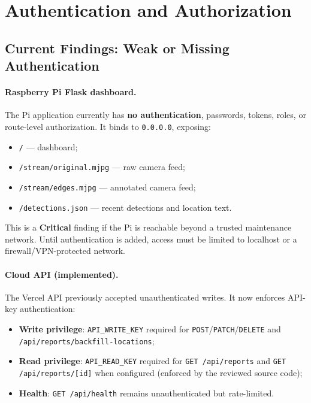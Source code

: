 \documentclass[12pt]{article}
\begin{document}
\section{Authentication and Authorization}
\label{sec:auth}

\subsection{Current Findings: Weak or Missing Authentication}

\paragraph{Raspberry Pi Flask dashboard.}
The Pi application currently has \textbf{no authentication}, passwords, tokens,
roles, or route-level authorization. It binds to \texttt{0.0.0.0}, exposing:

\begin{itemize}
    \item \texttt{/} --- dashboard;
    \item \texttt{/stream/original.mjpg} --- raw camera feed;
    \item \texttt{/stream/edges.mjpg} --- annotated camera feed;
    \item \texttt{/detections.json} --- recent detections and location text.
\end{itemize}

This is a \textbf{Critical} finding if the Pi is reachable beyond a trusted
maintenance network. Until authentication is added, access must be limited to
localhost or a firewall/VPN-protected network.

\paragraph{Cloud API (implemented).}
The Vercel API previously accepted unauthenticated writes. It now enforces
API-key authentication:

\begin{itemize}
    \item \textbf{Write privilege}: \texttt{API\_WRITE\_KEY} required for
          \texttt{POST}/\texttt{PATCH}/\texttt{DELETE} and
          \texttt{/api/reports/backfill-locations};
    \item \textbf{Read privilege}: \texttt{API\_READ\_KEY} required for
          \texttt{GET /api/reports} and \texttt{GET /api/reports/[id]} when
          configured (enforced by the reviewed source code);
    \item \textbf{Health}: \texttt{GET /api/health} remains unauthenticated but
          rate-limited.
\end{itemize}
\end{document}
